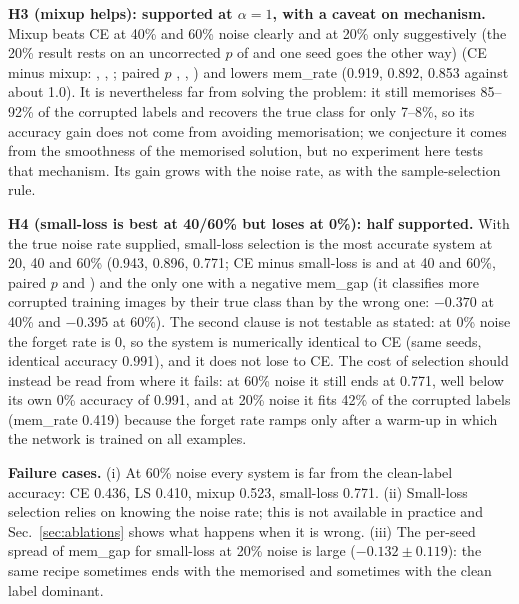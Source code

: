 \textbf{H3 (mixup helps): supported at $\alpha{=}1$, with a caveat on mechanism.} Mixup beats CE at 40\% and 60\% noise clearly and at 20\% only suggestively (the 20\% result rests on an uncorrected $p$ of  and one seed goes the other way) (CE minus mixup: , , ; paired $p$ , , ) and lowers mem\_rate (0.919, 0.892, 0.853 against about 1.0). It is nevertheless far from solving the problem: it still memorises 85--92\% of the corrupted labels and recovers the true class for only 7--8\%, so its accuracy gain does not come from avoiding memorisation; we conjecture it comes from the smoothness of the memorised solution, but no experiment here tests that mechanism. Its gain grows with the noise rate, as with the sample-selection rule.

\textbf{H4 (small-loss is best at 40/60\% but loses at 0\%): half supported.} With the true noise rate supplied, small-loss selection is the most accurate system at 20, 40 and 60\% (0.943, 0.896, 0.771; CE minus small-loss is  and  at 40 and 60\%, paired $p$  and ) and the only one with a negative mem\_gap (it classifies more corrupted training images by their true class than by the wrong one: $-0.370$ at 40\% and $-0.395$ at 60\%). The second clause is not testable as stated: at 0\% noise the forget rate is 0, so the system is numerically identical to CE (same seeds, identical accuracy 0.991), and it does not lose to CE. The cost of selection should instead be read from where it fails: at 60\% noise it still ends at 0.771, well below its own 0\% accuracy of 0.991, and at 20\% noise it fits 42\% of the corrupted labels (mem\_rate 0.419) because the forget rate ramps only after a warm-up in which the network is trained on all examples.

\textbf{Failure cases.} (i) At 60\% noise every system is far from the clean-label accuracy: CE 0.436, LS 0.410, mixup 0.523, small-loss 0.771. (ii) Small-loss selection relies on knowing the noise rate; this is not available in practice and Sec.~\ref{sec:ablations} shows what happens when it is wrong. (iii) The per-seed spread of mem\_gap for small-loss at 20\% noise is large ($-0.132\pm0.119$): the same recipe sometimes ends with the memorised and sometimes with the clean label dominant.
